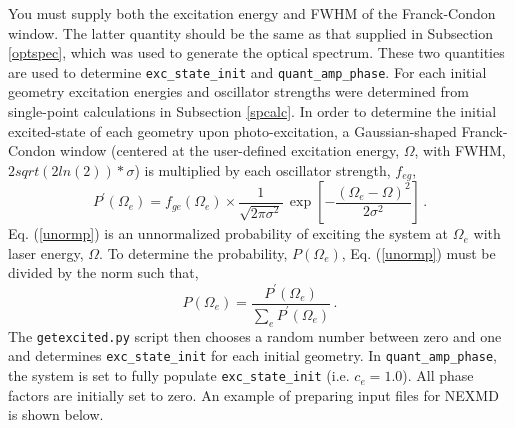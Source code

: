 \documentclass[letterpaper,12pt,titlepage]{article}
\begin{document}
You must supply both the excitation energy and FWHM of the Franck-Condon window.  The latter quantity should be the same as that supplied in Subsection \ref{optspec}, which was used to generate the optical spectrum.  These two quantities are used to determine \verb+exc_state_init+ and \verb+quant_amp_phase+.  For each initial geometry excitation energies and oscillator strengths were determined from single-point calculations in Subsection \ref{spcalc}.  In order to determine the initial excited-state of each geometry upon photo-excitation, a Gaussian-shaped Franck-Condon window (centered at the user-defined excitation energy, $\Omega$, with FWHM, $2sqrt(2ln(2))*\sigma$) is multiplied by each oscillator strength, $f_{eg}$,
\begin{equation}\label{unormp}
P^{\prime}\left(\Omega_{e}\right) = f_{ge}\left(\Omega_{e}\right)\times\frac{1}{\sqrt{2\pi\sigma^{2}}}\,\exp\left[-\frac{\left(\Omega_{e}-\Omega\right)^{2}}{2\sigma^{2}}\right]\,.
\end{equation}
Eq. (\ref{unormp}) is an unnormalized probability of exciting the system at $\Omega_{e}$ with laser energy, $\Omega$.  To determine the probability, $P\left(\Omega_{e}\right)$, Eq. (\ref{unormp}) must be divided by the norm such that,
\begin{equation}
P\left(\Omega_{e}\right) = \frac{P^{\prime}\left(\Omega_{e}\right)}{\sum_{e} P^{\prime}\left({\Omega_{e}}\right)}\,.
\end{equation}
The \verb+getexcited.py+ script then chooses a random number between zero and one and determines \verb+exc_state_init+ for each initial geometry.  In \verb+quant_amp_phase+, the system is set to fully populate \verb+exc_state_init+ (i.e. $c_{e} = 1.0$).  All phase factors are initially set to zero.  An example of preparing input files for NEXMD is shown below.
\end{document}

